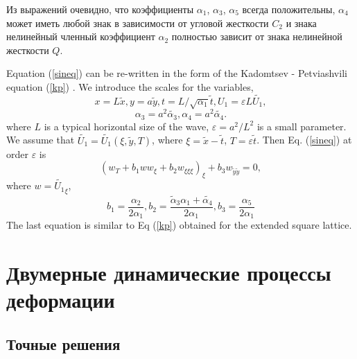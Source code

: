 Из выражений очевидно, что коэффициенты $ \alpha_1 $, $ \alpha_3 $, $ \alpha_5 $ всегда положительны, $\alpha_4 $ может иметь любой знак в зависимости от угловой жесткости $ C_2 $ и знака нелинейный членный коэффициент $ \alpha_2 $ полностью зависит от знака нелинейной жесткости $ Q $.

Equation (\ref{sineq}) can be re-written in the form of the Kadomtsev - Petviashvili equation (\ref{kp}) . We introduce the scales for the variables,
\[
x=L \tilde{x}, y=a\tilde{y}, t=L/\sqrt{\alpha_1} \tilde{t}, U_1=\varepsilon L \tilde{U_1}, 
\]
\[
\alpha_3=a^2 \tilde{\alpha_3}, \alpha_4=a^2 \tilde{\alpha_4}. 
\]
where $L$ is a typical horizontal size of the wave, $\varepsilon=a^2/L^2$ is a small parameter. We assume that 
$\tilde{U_1}=\tilde{U_1}(\xi, \tilde{y}, T)$, where $\xi=\tilde{x}-\tilde{t}$, $T=\varepsilon \tilde{t}$. Then Eq.  (\ref{sineq})  at order $\varepsilon$ is
\begin{equation}
	(w_T+b_1 w w_\xi+b_2 w_{\xi\xi\xi})_\xi+b_3 w_{\tilde{y}\tilde{y}}=0,
\end{equation}
where $w=\tilde{U_1}_\xi$,
\[
b_1=\frac{\alpha_2}{2\alpha_1}, b_2=\frac{\tilde\alpha_3 \alpha_1+\tilde{\alpha_4}}{2\alpha_1}, b_3=\frac{\alpha_5}{2\alpha_1}
\]
The last equation is similar to Eq (\ref{kp}) obtained for the extended square lattice.


\section{Двумерные динамические процессы деформации}

\subsection{Точные решения}

